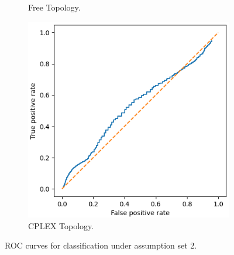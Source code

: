\begin{figure}[H]
\begin{subfigure}{0.475\textwidth}
        \caption{Free Topology.}
    \end{subfigure}
    \begin{subfigure}{0.475\textwidth}
        \includegraphics[width=\textwidth]{figs/results/norway_case2_roc.png}
        \caption{CPLEX Topology.}
    \end{subfigure}
    \caption{ROC curves for classification under assumption set 2.}
    \label{fig:RA2ROCcurves}
\end{figure}

